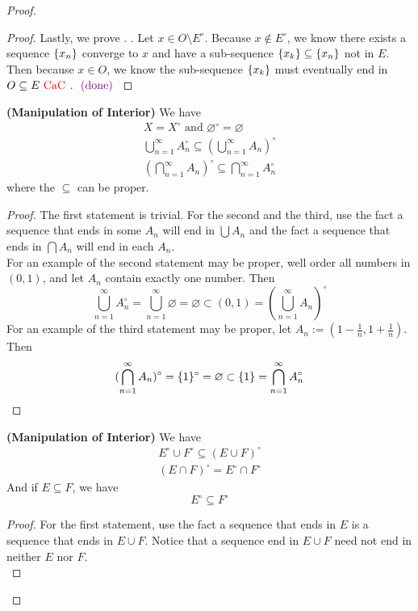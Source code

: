 \documentclass{report}
\begin{document}
\begin{proof}
\begin{proof}
Lastly, we prove . . Let $x\in O\setminus E^\circ $. Because $x\not\in E^\circ $, we know there exists a sequence $\{ x_n \}$ converge to $x$ and have a sub-sequence  $\{ x_k \}\subseteq \{ x_n \}$ not in $E$. Then because $x\in O$, we know the sub-sequence $\{ x_k \}$ must eventually end in $O\subseteq E\text{ \textcolor{red}{CaC} }$. $\textcolor{violet}{\text{ (done) }}$
\end{proof}
\begin{theorem}
\label{1.3.3}
\textbf{(Manipulation of Interior)} We have
\begin{gather}
X=X^\circ\text{ and }\varnothing^\circ =\varnothing\\
\bigcup_{n=1}^\infty A_n^\circ \subseteq (\bigcup_{n=1}^\infty A_n)^\circ\\
(\bigcap _{n=1}^\infty A_n)^\circ \subseteq \bigcap _{n=1}^\infty A_n^\circ 
\end{gather}
where the $\subseteq$ can be proper.
\end{theorem}
\begin{proof}
The first statement is trivial. For the second and the third, use the fact a sequence that ends in  some $A_n$ will end in  $\bigcup A_n$ and the fact a sequence that ends in $\bigcap A_n$ will end in each $A_n$.\\

For an example of the second statement may be proper, well order all numbers in $(0,1)$, and let $A_n$ contain exactly one number. Then
\begin{equation}
\bigcup_{n=1}^\infty A_n^\circ=\bigcup_{n=1}^\infty \varnothing=\varnothing \subset (0,1)=(\bigcup_{n=1}^\infty A_n)^\circ 
\end{equation}
For an example of the third statement may be proper, let $A_n:=(1-\frac{1}{n},1+\frac{1}{n})$. Then
\begin{equation}
  (\bigcap _{n=1}^\infty A_n)^\circ =\{ 1 \}^\circ =\varnothing \subset \{ 1 \}=\bigcap_{n=1}^\infty A_n^\circ 
\end{equation}
\end{proof}
\begin{theorem}
\label{1.3.4}
\textbf{(Manipulation of Interior)} We have
\begin{gather}
E^\circ \cup F^\circ\subseteq (E\cup F)^\circ\\
(E\cap F)^\circ = E^\circ \cap F^\circ 
\end{gather}
And if $E\subseteq F$, we have
\begin{equation}
E^\circ \subseteq F^\circ 
\end{equation}
\end{theorem}
\begin{proof}
For the first statement, use the fact a sequence that ends in $E$ is a sequence that ends in $E\cup F$. Notice that a sequence end in $E\cup F$ need not end in neither $E$ nor  $F$.\\


\end{proof}
\end{proof}
\end{document}
